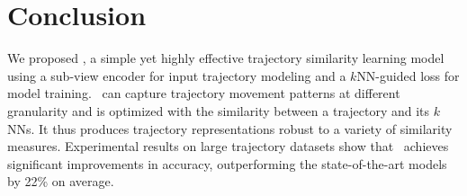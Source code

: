 \section{Conclusion}\label{sec:conclusion}


We proposed \model, a simple yet highly effective trajectory similarity learning model using a sub-view encoder for input trajectory modeling and a $k$NN-guided loss for model training. 
\model\ can capture trajectory movement patterns at different granularity and is optimized with the similarity between a trajectory and its $k$NNs. It thus produces trajectory representations robust to a variety of similarity measures.  
Experimental results on large trajectory datasets show that \model\ achieves significant improvements in accuracy, outperforming the state-of-the-art models by 22\% on average.
